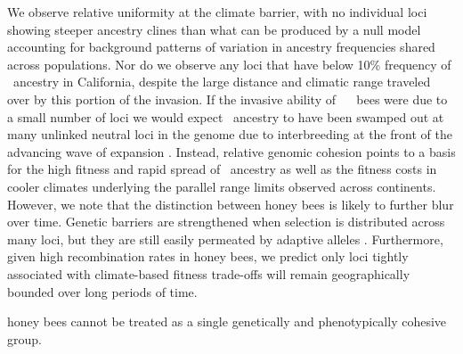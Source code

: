 We observe relative uniformity at the climate barrier, with no individual loci showing steeper ancestry clines than what can be produced by a null model accounting for background patterns of variation in ancestry frequencies shared across populations. Nor do we observe any loci that have below 10\% frequency of \A\ ancestry in California, despite the large distance and climatic range traveled over by this portion of the invasion. If the invasive ability of \africanized\ \hyb\  bees were due to a small number of loci we would expect \scutellata\ ancestry to have been swamped out at many unlinked neutral loci in the genome due to interbreeding at the front of the advancing wave of expansion \cite{currat2008hidden}. Instead, relative genomic cohesion points to a  basis for the high fitness and rapid spread of \scutellata\ ancestry as well as the fitness costs in cooler climates underlying the parallel range limits observed across continents. However, we note that the distinction between  honey bees is likely to further blur over time. Genetic barriers are strengthened when selection is distributed across many loci, but they are still easily permeated by adaptive alleles \cite{Barton:1986wp}. Furthermore, given high recombination rates in honey bees, we predict only loci tightly associated with climate-based fitness trade-offs will remain geographically bounded over long periods of time.

 honey bees cannot be treated as a single genetically and phenotypically cohesive group.  

